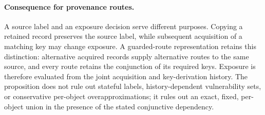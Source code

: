 \paragraph{Consequence for provenance routes.}
A source label and an exposure decision serve different purposes.  Copying
a retained record preserves the source label, while subsequent acquisition
of a matching key may change exposure.  A guarded-route representation
retains this distinction: alternative acquired records supply alternative
routes to the same source, and every route retains the conjunction of its
required keys.  Exposure is therefore evaluated from the joint acquisition
and key-derivation history.  The proposition does not rule out stateful
labels, history-dependent vulnerability sets, or conservative per-object
overapproximations; it rules out an exact, fixed, per-object union in the
presence of the stated conjunctive dependency.
